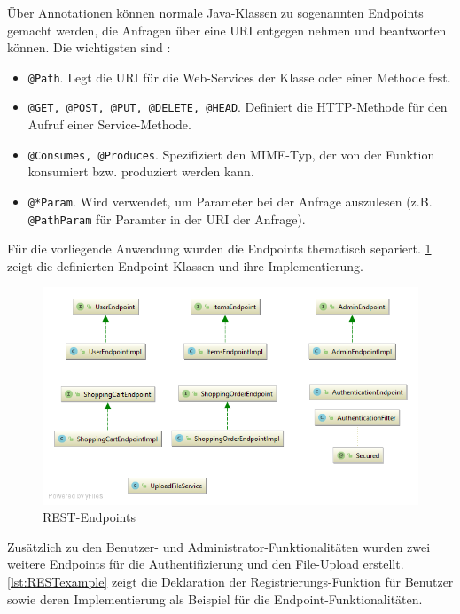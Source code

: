 Über Annotationen können normale Java-Klassen zu sogenannten Endpoints gemacht werden, die Anfragen über eine \acs{URI} entgegen nehmen und beantworten können.
Die wichtigsten sind \cite{Jersey2017a}:

\begin{itemize}
\item{\texttt{@Path}.} Legt die \acs{URI} für die Web-Services der Klasse oder einer Methode fest.
\item{\texttt{@GET, @POST, @PUT, @DELETE, @HEAD}.} Definiert die \acs{HTTP}-Methode für den Aufruf einer Service-Methode.
\item{\texttt{@Consumes, @Produces}.} Spezifiziert den \acs{MIME}-Typ, der von der Funktion konsumiert bzw. produziert werden kann.
\item{\texttt{@*Param}.} Wird verwendet, um Parameter bei der Anfrage auszulesen (z.B. \texttt{@PathParam} für Paramter in der \acs{URI} der Anfrage).
\end{itemize}

Für die vorliegende Anwendung wurden die Endpoints thematisch separiert.
\cref{fig:endpoints} zeigt die definierten Endpoint-Klassen und ihre Implementierung.

\begin{figure}[th!]
	\centering
	\includegraphics[width=0.8\linewidth]{bilder/kap7/api_diagram}
	\caption{REST-Endpoints}
	\label{fig:endpoints}
\end{figure}

Zusätzlich zu den Benutzer- und Administrator-Funktionalitäten wurden zwei weitere Endpoints für die Authentifizierung und den File-Upload erstellt.
\\


\cref{lst:RESTexample} zeigt die Deklaration der Registrierungs-Funktion für Benutzer sowie deren Implementierung als Beispiel für die Endpoint-Funktionalitäten.

